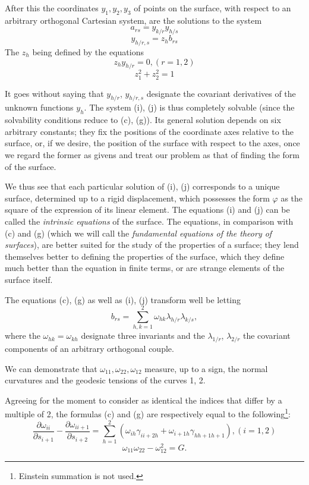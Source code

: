 \documentclass{book}
\begin{document}
After this the coordinates $y_1,y_2,y_3$ of points on the surface, with respect to an arbitrary orthogonal Cartesian system, are the solutions to the system
\begin{equation*}
\tag{i}
a_{rs}=y_{k/r}y_{h/s}
\end{equation*}
\begin{equation*}
\tag{j}
y_{h/r,s}=z_hb_{rs}
\end{equation*}
The $z_h$ being defined by the equations 
$$z_hy_{h/r}=0, (r=1,2)$$
$$z_1^2+z_2^2=1$$

It goes without saying that $y_{h/r}$, $y_{h/r,s}$ designate the covariant derivatives of the unknown functions $y_h$. The system (i), (j) is thus completely solvable (since the solvability conditions reduce to (c), (g)). Its general solution depends on six arbitrary constants; they fix the positions of the coordinate axes relative to the surface, or, if we desire, the position of the surface with respect to the axes, once we regard the former as givens and treat our problem as that of finding the form of the surface.	

We thus see that each particular solution of (i), (j) corresponds to a unique surface, determined up to a rigid displacement, which possesses the form $\varphi$ as the square of the expression of its linear element. The equations (i) and (j) can be called the \emph{intrinsic equations} of the surface. The equations, in comparison with (c) and (g) (which we will call the \emph{fundamental equations of the theory of surfaces}), are better suited for the study of the properties of a surface; they lend themselves better to defining the properties of the surface, which they define much better than the equation in finite terms, or are strange elements of the surface itself. 

The equations (c), (g) as well as (i), (j) transform well be letting
\begin{equation}
b_{rs}=\sum_{h,k=1}^2\omega_{hk}\lambda_{h/r}\lambda_{k/s},
\end{equation}
where the $\omega_{hk}=\omega_{kh}$ designate three invariants and the $\lambda_{1/r}$, $\lambda_{2/r}$ the covariant components of an arbitrary orthogonal couple. 

We can demonstrate that $\omega_{11},\omega_{22},\omega_{12}$ measure, up to a sign, the normal curvatures and the geodesic tensions of the curves 1, 2.

Agreeing for the moment to consider as identical the indices that differ by a multiple of 2, the formulas (c) and (g) are respectively equal to the following\footnote{Einstein summation is not used.}:
\begin{equation*}
\tag{$c_1$}
\frac{\partial \omega_{ii}}{\partial s_{i+1}}-\frac{\partial \omega_{ii+1}}{\partial s_{i+2}}=\sum_{h=1}^2(\omega_{ih}\gamma_{ii+2h}+\omega_{i+1h}\gamma_{hh+1h+1}), (i=1,2)
\end{equation*}
\begin{equation*}
\tag{$g_1$}
\omega_{11}\omega_{22}-\omega_{12}^2=G.
\end{equation*}
\end{document}
